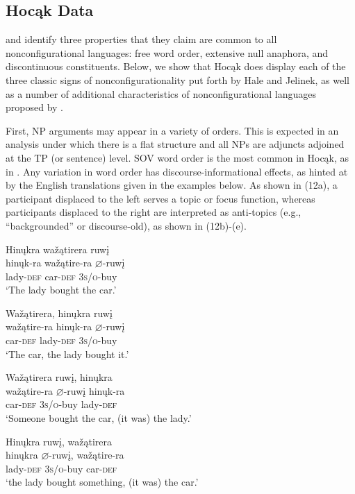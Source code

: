 \documentclass[output=paper]{LSP/langsci}
\begin{document}
\subsection{Hocąk Data}\label{sec:jrs:2.3}

\citet{Hale1983} and \citet{Jelinek1984} identify three properties that they claim are common to all nonconfigurational languages: free word order, extensive null anaphora, and discontinuous constituents. Below, we show that Hocąk does display each of the three classic signs of nonconfigurationality put forth by Hale and Jelinek, as well as a number of additional characteristics of nonconfigurational languages proposed by \citet{Baker1996}.  

First, NP arguments may appear in a variety of orders.  This is expected in an analysis under which there is a flat structure and all NPs are adjuncts adjoined at the TP (or sentence) level. SOV word order is the most common in Hocąk, as in . Any variation in word order has discourse-informational effects, as hinted at by the English translations given in the examples below. As shown in (12a), a participant displaced to the left serves a topic or focus function, whereas participants displaced to the right are interpreted as anti-topics (e.g., ``backgrounded'' or discourse-old), as shown in (12b)-(e).

\ea
\label{ex:jrs:11} 
\glll Hin\k{u}kra wa\v{z}ątirera ruw\k{i}  \\
hin\k{u}k-ra	wa\v{z}ątire-ra 	$\varnothing$-ruw\k{i} \\
lady-\textsc{def}	car-\textsc{def}	 \textsc{3s/o}-buy \\
\trans `The lady bought the car.'
\z

\ea\label{ex:jrs:12}
\ex
\glll Wa\v{z}ątirera,	hin\k{u}kra		ruw\k{i} \\
wa\v{z}ątire-ra 	hin\k{u}k-ra		$\varnothing$-ruw\k{i} \\
car-\textsc{def}			lady-\textsc{def}		\textsc{3s/o}-buy \\
\trans `The car, the lady bought it.' 

\ex
\glll Wa\v{z}ątirera		ruw\k{i},			hin\k{u}kra\\
wa\v{z}ątire-ra	$\varnothing$-ruw\k{i}	hin\k{u}k-ra \\
car-\textsc{def} 			\textsc{3s/o}-buy 	lady-\textsc{def} \\
\trans `Someone bought the car, (it was) the lady.' 

\ex
\glll Hin\k{u}kra 		ruw\k{i}, 		wa\v{z}ątirera \\
hin\k{u}kra 	$\varnothing$-ruw\k{i}, 		wa\v{z}ątire-ra \\
lady-\textsc{def} \textsc{3s/o}-buy car-\textsc{def} \\
\trans `the lady bought something, (it was) the car.' 
\end{document}
